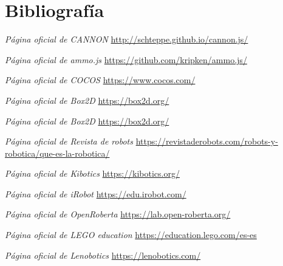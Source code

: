 \chapter{Bibliografía}
\label{chap:bibliografia} 

\textit{Página oficial de \textit{CANNON}} \newline
\url{http://schteppe.github.io/cannon.js/}\newline

\textit{Página oficial de \textit{ammo.js}} \newline
\url{https://github.com/kripken/ammo.js/}\newline

\textit{Página oficial de \textit{COCOS}}\newline
\url{https://www.cocos.com/}\newline

\textit{Página oficial de \textit{Box2D}}\newline
\url{https://box2d.org/}\newline

\textit{Página oficial de \textit{Box2D}}\newline
\url{https://box2d.org/}\newline

\textit{Página oficial de \textit{Revista de robots}}\newline
\url{https://revistaderobots.com/robots-y-robotica/que-es-la-robotica/}\newline

\textit{Página oficial de \textit{Kibotics}}\newline
\url{https://kibotics.org/}\newline

\textit{Página oficial de \textit{iRobot}}\newline
\url{https://edu.irobot.com/}\newline

\textit{Página oficial de \textit{OpenRoberta}}\newline
\url{https://lab.open-roberta.org/}\newline

\textit{Página oficial de \textit{LEGO education}}\newline
\url{https://education.lego.com/es-es}\newline

\textit{Página oficial de \textit{Lenobotics}}\newline
\url{https://lenobotics.com/}\newline

